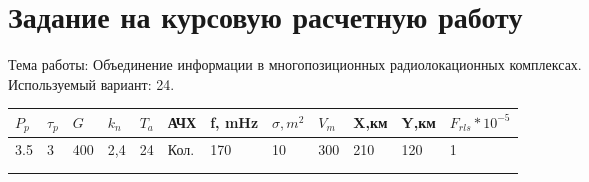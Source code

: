 \chapter{Задание на курсовую расчетную работу}
\label{cha:appendix1}

Тема работы: Объединение информации в многопозиционных радиолокационных комплексах. \\

Используемый вариант: 24. 

\begin{table}[]
\begin{tabular}{llllllllllll}
\hline
\multicolumn{1}{|l|}{$P_p$} & \multicolumn{1}{l|}{$\tau_p$} & \multicolumn{1}{l|}{$G$}   & \multicolumn{1}{l|}{$k_n$}  & \multicolumn{1}{l|}{$T_a$} & \multicolumn{1}{l|}{АЧХ}         & \multicolumn{1}{l|}{f, mHz} & \multicolumn{1}{l|}{$\sigma, m^2$} & \multicolumn{1}{l|}{$V_m$} & \multicolumn{1}{l|}{X,км} & \multicolumn{1}{l|}{Y,км} & \multicolumn{1}{l|}{$F_{rls}*10^{-5}$} \\ \hline
\multicolumn{1}{|l|}{3.5}     & \multicolumn{1}{l|}{3}       & \multicolumn{1}{l|}{400} & \multicolumn{1}{l|}{2,4} & \multicolumn{1}{l|}{24} & \multicolumn{1}{l|}{Кол.} & \multicolumn{1}{l|}{170}    & \multicolumn{1}{l|}{10}    & \multicolumn{1}{l|}{300}     & \multicolumn{1}{l|}{210}   & \multicolumn{1}{l|}{120}   & \multicolumn{1}{l|}{1}         \\ \hline
                              &                              &                          &                          &                         &                                  &                             &                            &                              &                            &                            &                                \\
                              &                              &                          &                          &                         &                                  &                             &                            &                              &                            &                            &                               
\end{tabular}
\end{table}